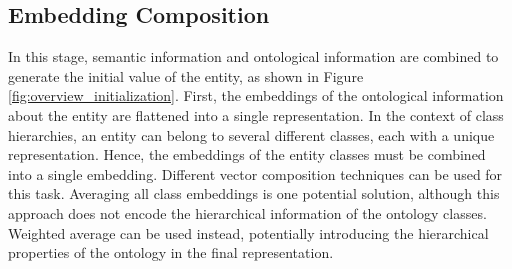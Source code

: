 \subsection{Embedding Composition} \label{subsec:s4_embedding_compo}
In this stage, semantic information and ontological information are combined to generate the initial value of the entity, as shown in Figure \ref{fig:overview_initialization}. First, the embeddings of the ontological information about the entity are flattened into a single representation. In the context of class hierarchies, an entity can belong to several different classes, each with a unique representation. Hence, the embeddings of the entity classes must be combined into a single embedding. Different vector composition techniques can be used for this task. Averaging all class embeddings is one potential solution, although this approach does not encode the hierarchical information of the ontology classes. Weighted average can be used instead, potentially introducing the hierarchical properties of the ontology in the final representation.


